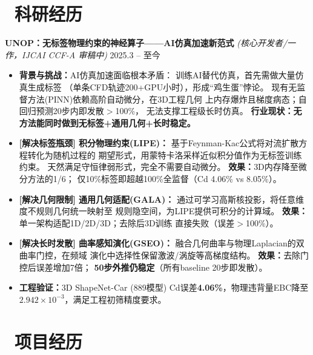 \documentclass[11pt]{article}
\begin{document}
\section{\makebox[\widthof{\faUsers}][c]{\color{CVBlue}\faUsers}\ 
科研经历}

\textbf{UNOP：无标签物理约束的神经算子——AI仿真加速新范式} 
\textit{(核心开发者/一作，IJCAI CCF-A 审稿中)} 
\hfill 2025.3 -- 至今
\begin{itemize}
    \item \textbf{背景与挑战：}AI仿真加速面临根本矛盾：
    训练AI替代仿真，首先需做大量仿真生成标签
    （单条CFD轨迹200+GPU小时），形成``鸡生蛋''悖论。
    现有无监督方法(PINN)依赖高阶自动微分，在3D工程几何
    上内存爆炸且梯度病态；自回归预测20步内即发散$>$100\%，
    无法支撑工程级长时仿真。
    \textbf{行业现状：无方法能同时做到无标签+通用几何+长时稳定。}

    \item \textbf{[解决标签瓶颈] 积分物理约束(LIPE)：}
    基于Feynman-Kac公式将对流扩散方程转化为随机过程的
    期望形式，用蒙特卡洛采样近似积分值作为无标签训练约束。
    天然满足守恒律弱形式，完全不需要自动微分。
    \textbf{效果：}3D内存降至微分方法的1/6；
    仅10\%标签即超越100\%全监督（Cd 4.06\% vs 8.05\%）。

    \item \textbf{[解决几何限制] 通用几何适配(GALA)：}
    通过可学习高斯核投影，将任意维度不规则几何统一映射至
    规则隐空间，为LIPE提供可积分的计算域。
    \textbf{效果：}单一架构适配1D/2D/3D；去除后3D训练
    直接失败（误差$>$100\%）。

    \item \textbf{[解决长时发散] 曲率感知演化(GSEO)：}
    融合几何曲率与物理Laplacian的双曲率门控，在频域
    演化中选择性保留激波/涡旋等高梯度结构。
    \textbf{效果：}去除门控后误差增加7倍；
    \textbf{50步外推仍稳定}（所有baseline 20步即发散）。

    \item \textbf{工程验证：}3D ShapeNet-Car (889模型) 
    Cd误差\textbf{4.06\%}，物理违背量EBC降至
    $2.942\times10^{-3}$，满足工程初筛精度要求。
\end{itemize}

\section{\makebox[\widthof{\faBriefcase}][c]{\color{CVBlue}%
\faBriefcase}\ 项目经历}
\end{document}
